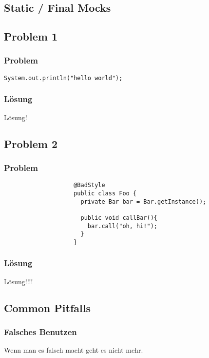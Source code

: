 \documentclass{beamer}
\begin{document}
		\subsection{Static / Final Mocks}

		\subsection{Problem 1}

			\begin{frame}
				\frametitle{Problem}
				\lstinline|System.out.println("hello world");|
			\end{frame}

			\begin{frame}
				\frametitle{Lösung}
				Lösung!
			\end{frame}


		\subsection{Problem 2}

			\begin{frame}[fragile]
				\frametitle{Problem}

				\begin{lstlisting}
					@BadStyle
					public class Foo {
					  private Bar bar = Bar.getInstance();

					  public void callBar(){
					    bar.call("oh, hi!");
					  }
					}
				\end{lstlisting}

			\end{frame}

			\begin{frame}
				\frametitle{Lösung}
				Lösung!!!!
			\end{frame}

		\subsection{Common Pitfalls}

			\begin{frame}
				\frametitle{Falsches Benutzen}
				Wenn man es falsch macht geht es nicht mehr.
			\end{frame}
\end{document}
